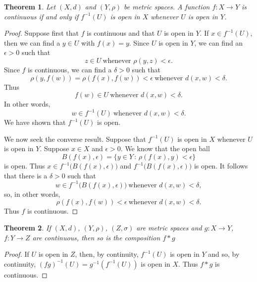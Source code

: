 \documentclass[12pt,a4paper]{article}
\theoremstyle{plain}
\newtheorem{theorem}{Theorem}[section]
\begin{document}
\begin{theorem}
    Let $(X,d)$ and $(Y,\rho)$ be metric spaces. A function $f:X\rightarrow Y$ is continuous if and only if $f^{-1}(U)$ is open in $X$ whenever $U$ is open in $Y$.
\end{theorem}
\begin{proof}
    Suppose first that $f$ is continuous
and that $U$ is open in $Y$. If $x\in f^{-1}(U)$, then
we can find a $y\in U$ with $f(x)=y$. Since $U$ is
open in $Y$, we can find an $\epsilon>0$ such that
\[z\in U\ \text{whenever $\rho(y,z)<\epsilon$}.\]
Since $f$ is continuous, we can find a $\delta>0$
such that
\[\rho(y,f(w))=\rho(f(x),f(w))<\epsilon
\ \text{whenever $d(x,w)<\delta$}.\]
Thus 
\[f(w)\in U\ \text{whenever $d(x,w)<\delta$}.\]
In other words,
\[w\in f^{-1}(U)\ \text{whenever $d(x,w)<\delta$}.\]
We have shown that $f^{-1}(U)$ is open.

We now seek the converse result. Suppose that
$f^{-1}(U)$ is open in $X$ whenever $U$ is open in $Y$.
Suppose $x\in X$ and $\epsilon>0$. We know that the
open ball
\[B(f(x),\epsilon)=\{y\in Y\,:\, \rho(f(x),y)<\epsilon\}\]
is open. Thus
$x\in f^{-1}\big(B(f(x),\epsilon)\big)$ and
$f^{-1}\big(B(f(x),\epsilon)\big)$ is open. It follows that
there is a $\delta>0$ such that
\[w\in f^{-1}\big(B(f(x),\epsilon)\big)\ \text{whenever $d(x,w)<\delta$},\]
so, in other words,
\[\rho(f(x),f(w))<\epsilon\ \text{whenever $d(x,w)<\delta$}.\]
Thus $f$ is continuous.
\end{proof}

\begin{theorem}
    If $(X,d)$, $(Y,\rho)$, $(Z,\sigma)$ are metric spaces and $g:X\rightarrow Y$, $f:Y\rightarrow Z$ are continuous, then so is the composition $f*g$
\end{theorem}
\begin{proof}
    If $U$ is open in $Z$, then, by continuity, $f^{-1}(U)$ is open in $Y$ and so, by continuity, $(fg)^{-1}(U)=g^{-1}(f^{-1}(U))$ is open in $X$. Thus $f*g$ is continuous. 
\end{proof}
    
\end{document}
